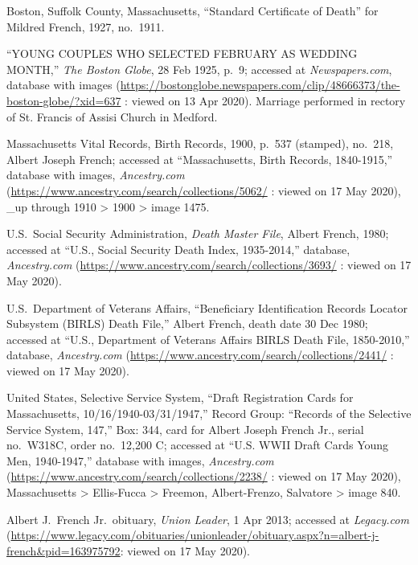\begin{thebibliography}{999}
Boston, Suffolk County, Massachusetts, ``Standard Certificate of Death'' for Mildred French, 1927, no.\ 1911.

``YOUNG COUPLES WHO SELECTED FEBRUARY AS WEDDING MONTH,'' \textit{The Boston Globe}, 28 Feb 1925, p.\ 9; accessed at \textit{Newspapers.com}, database with images (\url{https://bostonglobe.newspapers.com/clip/48666373/the-boston-globe/?xid=637} : viewed on 13 Apr 2020). Marriage performed in rectory of St. Francis of Assisi Church in Medford.

Massachusetts Vital Records, Birth Records, 1900, p.\ 537 (stamped), no.\ 218, Albert Joseph French; accessed at ``Massachusetts, Birth Records, 1840-1915,'' database with images, \textit{Ancestry.com} (\url{https://www.ancestry.com/search/collections/5062/} : viewed on 17 May 2020), \_up through 1910 > 1900 > image 1475.

U.S.\ Social Security Administration, \textit{Death Master File}, Albert French, 1980; accessed at ``U.S., Social Security Death Index, 1935-2014,'' database, \textit{Ancestry.com} (\url{https://www.ancestry.com/search/collections/3693/} : viewed on 17 May 2020).

U.S.\ Department of Veterans Affairs, ``Beneficiary Identification Records Locator Subsystem (BIRLS) Death File,'' Albert French, death date 30 Dec 1980; accessed at ``U.S., Department of Veterans Affairs BIRLS Death File, 1850-2010,'' database, \textit{Ancestry.com} (\url{https://www.ancestry.com/search/collections/2441/} : viewed on 17 May 2020).

United States, Selective Service System, ``Draft Registration Cards for Massachusetts, 10/16/1940-03/31/1947,'' Record Group: ``Records of the Selective Service System, 147,'' Box: 344, card for Albert Joseph French Jr., serial no.\ W318C, order no.\ 12,200 C; accessed at ``U.S. WWII Draft Cards Young Men, 1940-1947,'' database with images, \textit{Ancestry.com} (\url{https://www.ancestry.com/search/collections/2238/} : viewed on 17 May 2020), Massachusetts > Ellis-Fucca > Freemon, Albert-Frenzo, Salvatore > image 840.

Albert J.\ French Jr.\ obituary, \textit{Union Leader}, 1 Apr 2013; accessed at \textit{Legacy.com} (\url{https://www.legacy.com/obituaries/unionleader/obituary.aspx?n=albert-j-french\&pid=163975792}: viewed on 17 May 2020).


\end{thebibliography}
